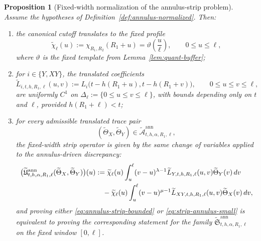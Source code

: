\documentclass[11pt,a4paper]{amsart}
\theoremstyle{plain}
\newtheorem{proposition}[theorem]{Proposition}
\theoremstyle{definition}
\theoremstyle{remark}
\begin{document}
\begin{proposition}[Fixed-width normalization of the annulus-strip problem]
\label{prop:annulus-normalized}
Assume the hypotheses of Definition~\ref{def:annulus-normalized}. Then:
\begin{enumerate}[label=(\roman*)]
\item the canonical cutoff translates to the fixed profile
\[
\widetilde\chi_\ell(u):=\chi_{R_1,R_2}(R_1+u)=\vartheta\!\left(\frac{u}{\ell}\right),
\qquad 0\le u\le \ell,
\]
where \(\vartheta\) is the fixed template from Lemma~\ref{lem:quant-buffer};
\item for \(i\in\{Y,XY\}\), the translated coefficients
\[
\widetilde L_{i,t,h,R_1,\ell}(u,v)
:=
L_i\bigl(t-h(R_1+u),t-h(R_1+v)\bigr),
\qquad 0\le u\le v\le \ell,
\]
are uniformly \(C^1\) on \(\Delta_\ell:=\{0\le u\le v\le \ell\}\), with bounds depending only on
\(t\) and \(\ell\), provided \(h(R_1+\ell)<t\);
\item for every admissible translated trace pair
\[
(\widetilde\Theta_X,\widetilde\Theta_Y)\in
\widetilde{\mathcal A}_{t,h,\alpha,R_1,\ell}^{\mathrm{ann}},
\]
the fixed-width strip operator is given by the same change of variables applied to the
annulus-driven discrepancy:
\begin{align}
\bigl(
\widetilde{\mathfrak U}_{t,h,\alpha,R_1,\ell}^{\mathrm{ann}}
(\widetilde\Theta_X,\widetilde\Theta_Y)
\bigr)(u)
&:=
\widetilde\chi_\ell(u)
\int_u^\ell
(v-u)^{\lambda-1}
\widetilde L_{Y,t,h,R_1,\ell}(u,v)\widetilde\Theta_Y(v)\,dv
\notag\\
&\quad-
\widetilde\chi_\ell(u)
\int_u^\ell
(v-u)^{\mu-1}
\widetilde L_{XY,t,h,R_1,\ell}(u,v)\widetilde\Theta_X(v)\,dv,
\label{eq:annulus-normalized-U}
\end{align}
and proving either \eqref{eq:annulus-strip-bounded} or \eqref{eq:strip-annulus-small} is
equivalent to proving the corresponding statement for the family
\(\widetilde{\mathfrak S}_{t,h,\alpha,R_1,\ell}^{\mathrm{ann}}\) on the fixed window \([0,\ell]\).
\end{enumerate}
\end{proposition}
\end{document}
